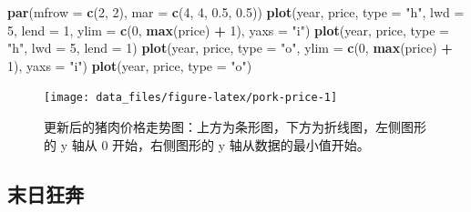 \documentclass[
  b5paper,
  UTF8,twoside]{book}
\newenvironment{Shaded}{\begin{snugshade}}{\end{snugshade}}
\newcommand{\AttributeTok}[1]{\textcolor[rgb]{0.13,0.29,0.53}{#1}}
\newcommand{\DecValTok}[1]{\textcolor[rgb]{0.00,0.00,0.81}{#1}}
\newcommand{\FloatTok}[1]{\textcolor[rgb]{0.00,0.00,0.81}{#1}}
\newcommand{\FunctionTok}[1]{\textcolor[rgb]{0.13,0.29,0.53}{\textbf{#1}}}
\newcommand{\NormalTok}[1]{#1}
\newcommand{\SpecialCharTok}[1]{\textcolor[rgb]{0.81,0.36,0.00}{\textbf{#1}}}
\newcommand{\StringTok}[1]{\textcolor[rgb]{0.31,0.60,0.02}{#1}}
\begin{document}
\begin{Shaded}
\begin{Highlighting}[]
\FunctionTok{par}\NormalTok{(}\AttributeTok{mfrow =} \FunctionTok{c}\NormalTok{(}\DecValTok{2}\NormalTok{, }\DecValTok{2}\NormalTok{), }\AttributeTok{mar =} \FunctionTok{c}\NormalTok{(}\DecValTok{4}\NormalTok{, }\DecValTok{4}\NormalTok{, }\FloatTok{0.5}\NormalTok{, }\FloatTok{0.5}\NormalTok{))}
\FunctionTok{plot}\NormalTok{(year, price, }\AttributeTok{type =} \StringTok{"h"}\NormalTok{, }\AttributeTok{lwd =} \DecValTok{5}\NormalTok{, }\AttributeTok{lend =} \DecValTok{1}\NormalTok{, }\AttributeTok{ylim =} \FunctionTok{c}\NormalTok{(}\DecValTok{0}\NormalTok{, }\FunctionTok{max}\NormalTok{(price) }\SpecialCharTok{+} \DecValTok{1}\NormalTok{), }\AttributeTok{yaxs =} \StringTok{"i"}\NormalTok{)}
\FunctionTok{plot}\NormalTok{(year, price, }\AttributeTok{type =} \StringTok{"h"}\NormalTok{, }\AttributeTok{lwd =} \DecValTok{5}\NormalTok{, }\AttributeTok{lend =} \DecValTok{1}\NormalTok{)}
\FunctionTok{plot}\NormalTok{(year, price, }\AttributeTok{type =} \StringTok{"o"}\NormalTok{, }\AttributeTok{ylim =} \FunctionTok{c}\NormalTok{(}\DecValTok{0}\NormalTok{, }\FunctionTok{max}\NormalTok{(price) }\SpecialCharTok{+} \DecValTok{1}\NormalTok{), }\AttributeTok{yaxs =} \StringTok{"i"}\NormalTok{)}
\FunctionTok{plot}\NormalTok{(year, price, }\AttributeTok{type =} \StringTok{"o"}\NormalTok{)}
\end{Highlighting}
\end{Shaded}

\begin{figure}

{\centering \texttt{[image: data\_files/figure-latex/pork-price-1]} 

}

\caption[ 更新后的猪肉价格走势图 ]{更新后的猪肉价格走势图：上方为条形图，下方为折线图，左侧图形的 y 轴从 0 开始，右侧图形的 y 轴从数据的最小值开始。}\label{fig:pork-price}
\end{figure}



\subsection{末日狂奔}\label{subsec:canabalt}
\end{document}
